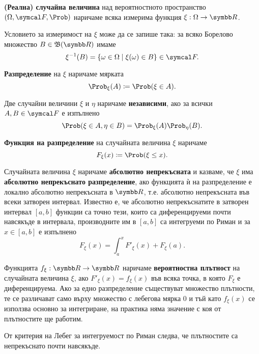 \documentclass[
  headings=standardclasses,
  bibliography=totocnumbered,
]{scrartcl}
\begin{document}
\begin{definition}
  \textbf{(Реална) случайна величина} над вероятностното пространство \( (\Omega, \F, \Prob) \) наричаме всяка измерима функция \( \xi : \Omega \to \R \).

  Условието за измеримост на \( \xi \) може да се запише така: за всяко Борелово множество \( B \in \BorelAlgebra(\R) \) имаме
  \begin{equation*}
    \xi^{-1} (B) = \{ \omega \in \Omega \mid \xi(\omega) \in B \} \in \F.
  \end{equation*}

  \textbf{Разпределение} на \( \xi \) наричаме мярката
  \begin{equation*}
    \Prob_\xi(A) \coloneqq \Prob(\xi \in A).
  \end{equation*}

  Две случайни величини \( \xi \) и \( \eta \) наричаме \textbf{независими}, ако за всички \( A, B \in \F \) е изпълнено
  \begin{equation*}
    \Prob(\xi \in A, \eta \in B) = \Prob_\xi(A) \Prob_\eta(B).
  \end{equation*}

  \textbf{Функция на разпределение} на случайната величина \( \xi \) наричаме
  \begin{equation*}
    F_\xi(x) \coloneqq \Prob(\xi \leq x).
  \end{equation*}

  Случайната величина \( \xi \) наричаме \textbf{абсолютно непрекъсната} и казваме, че \( \xi \) има \textbf{абсолютно непрекъснато разпределение}, ако функцията ѝ на разпределение е локално абсолютно непрекъсната в \( \R \), т.е. абсолютно непрекъсната във всеки затворен интервал. Известно е, че абсолютно непрекъснатите в затворен интервал \( [a, b] \) функции са точно тези, които са диференцируеми почти навсякъде в интервала, производните им в \( [a, b] \) са интегруеми по Риман и за \( x \in [a, b] \) е изпълнено
  \begin{equation*}
    F_\xi(x) = \int_a^x F'_\xi(x) + F_\xi(a).
  \end{equation*}

  Функцията \( f_\xi: \R \to \R \) наричаме \textbf{вероятностна плътност} на случайната величина \( \xi \), ако \( F'_\xi(x) = f_\xi(x) \) във всяка точка, в която \( F_\xi \) е диференцируема. Ако за едно разпределение съществуват множество плътности, те се различават само върху множество с лебегова мярка 0 и тъй като \( f_\xi(x) \) се използва основно за интегриране, на практика няма значение с коя от плътностите ще работим.

  От критерия на Лебег за интегруемост по Риман следва, че плътностите са непрекъснато почти навсякъде.
\end{definition}
\end{document}
